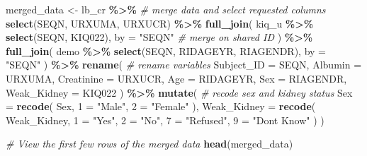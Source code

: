 \documentclass[
]{article}
\newenvironment{Shaded}{\begin{snugshade}}{\end{snugshade}}
\newcommand{\AttributeTok}[1]{\textcolor[rgb]{0.13,0.29,0.53}{#1}}
\newcommand{\CommentTok}[1]{\textcolor[rgb]{0.56,0.35,0.01}{\textit{#1}}}
\newcommand{\FunctionTok}[1]{\textcolor[rgb]{0.13,0.29,0.53}{\textbf{#1}}}
\newcommand{\NormalTok}[1]{#1}
\newcommand{\OtherTok}[1]{\textcolor[rgb]{0.56,0.35,0.01}{#1}}
\newcommand{\SpecialCharTok}[1]{\textcolor[rgb]{0.81,0.36,0.00}{\textbf{#1}}}
\newcommand{\StringTok}[1]{\textcolor[rgb]{0.31,0.60,0.02}{#1}}
\begin{document}
\begin{Shaded}
\begin{Highlighting}[]
\NormalTok{merged\_data }\OtherTok{\textless{}{-}}\NormalTok{ lb\_cr }\SpecialCharTok{\%\textgreater{}\%} \CommentTok{\# merge data and select requested columns }
  \FunctionTok{select}\NormalTok{(SEQN, URXUMA, URXUCR) }\SpecialCharTok{\%\textgreater{}\%}
  \FunctionTok{full\_join}\NormalTok{(}
\NormalTok{    kiq\_u }\SpecialCharTok{\%\textgreater{}\%}
      \FunctionTok{select}\NormalTok{(SEQN, KIQ022),}
    \AttributeTok{by =} \StringTok{"SEQN"} \CommentTok{\# merge on shared ID}
\NormalTok{  ) }\SpecialCharTok{\%\textgreater{}\%}
  \FunctionTok{full\_join}\NormalTok{(}
\NormalTok{    demo }\SpecialCharTok{\%\textgreater{}\%}
      \FunctionTok{select}\NormalTok{(SEQN, RIDAGEYR, RIAGENDR),}
    \AttributeTok{by =} \StringTok{"SEQN"}
\NormalTok{  ) }\SpecialCharTok{\%\textgreater{}\%}
  \FunctionTok{rename}\NormalTok{( }\CommentTok{\# rename variables}
    \AttributeTok{Subject\_ID =}\NormalTok{ SEQN,}
    \AttributeTok{Albumin =}\NormalTok{ URXUMA,}
    \AttributeTok{Creatinine =}\NormalTok{ URXUCR,}
    \AttributeTok{Age =}\NormalTok{ RIDAGEYR,}
    \AttributeTok{Sex =}\NormalTok{ RIAGENDR,}
    \AttributeTok{Weak\_Kidney =}\NormalTok{ KIQ022}
\NormalTok{  ) }\SpecialCharTok{\%\textgreater{}\%}
  \FunctionTok{mutate}\NormalTok{( }\CommentTok{\# recode sex and kidney status }
    \AttributeTok{Sex =} \FunctionTok{recode}\NormalTok{(}
\NormalTok{      Sex,}
      \StringTok{\textasciigrave{}}\AttributeTok{1}\StringTok{\textasciigrave{}} \OtherTok{=} \StringTok{"Male"}\NormalTok{,}
      \StringTok{\textasciigrave{}}\AttributeTok{2}\StringTok{\textasciigrave{}} \OtherTok{=} \StringTok{"Female"}
\NormalTok{    ),}
    \AttributeTok{Weak\_Kidney =} \FunctionTok{recode}\NormalTok{(}
\NormalTok{      Weak\_Kidney,}
      \StringTok{\textasciigrave{}}\AttributeTok{1}\StringTok{\textasciigrave{}} \OtherTok{=} \StringTok{"Yes"}\NormalTok{,}
      \StringTok{\textasciigrave{}}\AttributeTok{2}\StringTok{\textasciigrave{}} \OtherTok{=} \StringTok{"No"}\NormalTok{,}
      \StringTok{\textasciigrave{}}\AttributeTok{7}\StringTok{\textasciigrave{}} \OtherTok{=} \StringTok{"Refused"}\NormalTok{,}
      \StringTok{\textasciigrave{}}\AttributeTok{9}\StringTok{\textasciigrave{}} \OtherTok{=} \StringTok{"Don\textquotesingle{}t Know"}
\NormalTok{    )}
\NormalTok{  )}

\CommentTok{\# View the first few rows of the merged data}
\FunctionTok{head}\NormalTok{(merged\_data)}
\end{Highlighting}
\end{Shaded}
\end{document}
